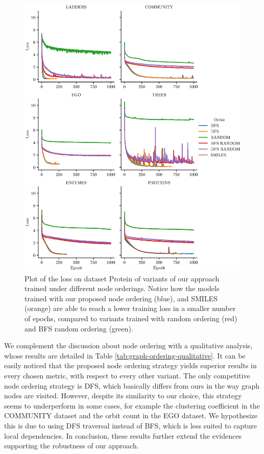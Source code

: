\begin{figure}[h!]
\centering
\includegraphics[width=\textwidth]{Figures/Chapter6/loss.eps}
\caption{Plot of the loss on dataset Protein of variants of our approach trained under different node orderings. Notice how the models trained with our proposed node ordering (blue), and SMILES (orange) are able to reach a lower training loss in a smaller number of epochs, compared to variants trained with random ordering (red) and BFS random ordering (green).}
\label{fig:loss}
\end{figure}
We complement the discussion about node ordering with a qualitative analysis, whose results are detailed in Table \ref{tab:graph-ordering-qualitative}. It can be easily noticed that the proposed node ordering strategy yields superior results in every chosen metric, with respect to every other variant. The only competitive node ordering strategy is DFS, which basically differs from ours in the way graph nodes are visited. However, despite its similarity to our choice, this strategy seems to underperform in some cases, for example the clustering coefficient in the COMMUNITY dataset and the orbit count in the EGO dataset. We hypothesize this is due to using DFS traversal instead of BFS, which is less suited to capture local dependencies. In conclusion, these results further extend the evidences supporting the robustness of our approach.


